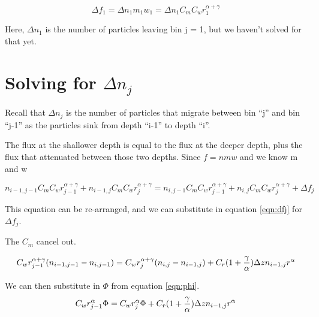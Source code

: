 \documentclass[a4paper,12pt]{article}
\begin{document}
\begin{equation}
\Delta f_1 = \Delta n_1 m_1 w_1 =  \Delta n_1 C_m C_w r_1^{\alpha + \gamma}
\label{eqn:df0}
\end{equation}

Here, $\Delta n_1$ is the number of particles leaving bin j = 1, but we haven't solved for that yet.

\section{Solving for $\Delta n_j$}

Recall that $\Delta n_j$ is the number of particles that migrate between bin ``j'' and bin ``j-1'' as the particles sink from depth ``i-1'' to depth ``i''.

The flux at the shallower depth is equal to the flux at the deeper depth, plus the flux that attenuated between those two depths. Since $f = nmw$ and we know m and w

\begin{equation}
n_{i-1,j-1} C_m C_w r_{j-1}^{\alpha + \gamma} + n_{i-1,j} C_m C_w r_{j}^{\alpha + \gamma} =
n_{i,j-1} C_m C_w r_{j-1}^{\alpha + \gamma} + n_{i,j} C_m C_w r_{j}^{\alpha + \gamma} + \Delta f_j
\label{eqn:n4f}
\end{equation}

This equation can be re-arranged, and we can substitute in equation \ref{eqn:dfj} for $\Delta f_j$. 
 

The $C_m$ cancel out.

\begin{equation}
 C_w r_{j-1} ^{\alpha + \gamma} (n_{i-1,j-1}- n_{i,j-1}) = 
 C_w r_{j}^{\alpha + \gamma} (n_{i,j} - n_{i-1,j}) +  C_r  (1 + {\gamma \over \alpha}) \Delta z n_{i-1,j} r ^ \alpha
\end{equation}

We can then substitute in $\Phi$ from equation \ref{eqn:phi}.
\begin{equation}
C_w r_{j-1} ^{\alpha} \Phi = 
 C_w r_{j}^{\alpha} \Phi +  C_r  (1 + {\gamma \over \alpha}) \Delta z n_{i-1,j} r ^ \alpha
\end{equation}
\end{document}
